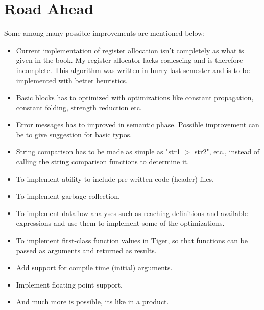 \section{Road Ahead}

Some among many possible improvements are mentioned below:-

\begin{itemize}
  \item Current implementation of register allocation isn't completely as what is given in the book. My register allocator lacks coalescing and is therefore incomplete. This algorithm was written in hurry last semester and is to be implemented with better heuristics.
  \item Basic blocks has to optimized with optimizations like constant propagation, constant folding, strength reduction etc.
  \item Error messages has to improved in semantic phase. Possible improvement can be to give suggestion for basic typos. 
  \item String comparison has to be made as simple as "str1 $>$ str2", etc.,  instead of calling the string comparison functions to determine it.
  \item To implement ability to include pre-written code (header) files.
  \item To implement garbage collection.
  \item To implement dataflow analyses such as reaching definitions and available expressions and use them to implement some of the optimizations. 
  \item To implement first-class function values in Tiger, so that functions can be passed as arguments and returned as results.
  \item Add support for compile time (initial) arguments.
  \item Implement floating point support.
  \item And much more is possible, its like in a product.
\end{itemize}
